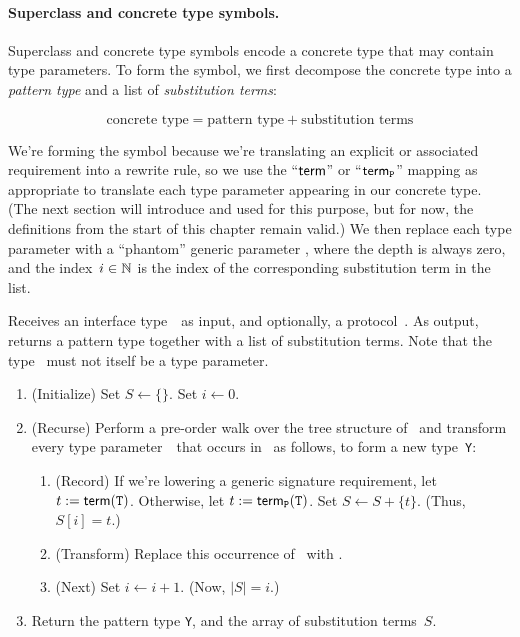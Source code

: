 \documentclass[../generics]{subfiles}
\begin{document}
\paragraph{Superclass and concrete type symbols.}
Superclass and concrete type symbols encode a concrete type that may contain type parameters. To form the symbol, we first decompose the concrete type into a \emph{pattern type} and a list of \emph{substitution terms}:
\begin{ceqn}
\[\text{concrete type} = \text{pattern type} + \text{substitution terms}\]
\end{ceqn}
We're forming the symbol because we're translating an explicit or associated requirement into a rewrite rule, so we use the ``$\mathsf{term}$'' or ``$\mathsf{term}_{\texttt{P}}$'' mapping as appropriate to translate each type parameter appearing in our concrete type. (The next section will introduce  and  used for this purpose, but for now, the definitions from the start of this chapter remain valid.) We then replace each type parameter with a ``phantom'' generic parameter , where the depth is always zero, and the index~$i\in\mathbb{N}$ is the index of the corresponding substitution term in the list.

\begin{algorithm}\label{concretesymbolcons}
Receives an interface type~\tX\ as input, and optionally, a protocol~\tP. As output, returns a pattern type together with a list of substitution terms. Note that the type \tX\ must not itself be a type parameter.
\begin{enumerate}
\item (Initialize) Set $S\leftarrow\{\}$. Set $i\leftarrow 0$.
\item (Recurse) Perform a pre-order walk over the tree structure of \tX\ and transform every type parameter~\tT\ that occurs in \tX\ as follows, to form a new type~\texttt{Y}:
\begin{enumerate}
\item (Record) If we're lowering a generic signature requirement, let $t := \mathsf{term}(\texttt{T})$. Otherwise, let $t := \mathsf{term}_{\texttt{P}}(\texttt{T})$. Set $S\leftarrow S + \{t\}$. (Thus, $S[i]=t$.)
\item (Transform) Replace this occurrence of \tT\ with .
\item (Next) Set $i\leftarrow i + 1$. (Now, $|S|=i$.)
\end{enumerate}
\item Return the pattern type \texttt{Y}, and the array of substitution terms~$S$.
\end{enumerate}
\end{algorithm}
\end{document}

